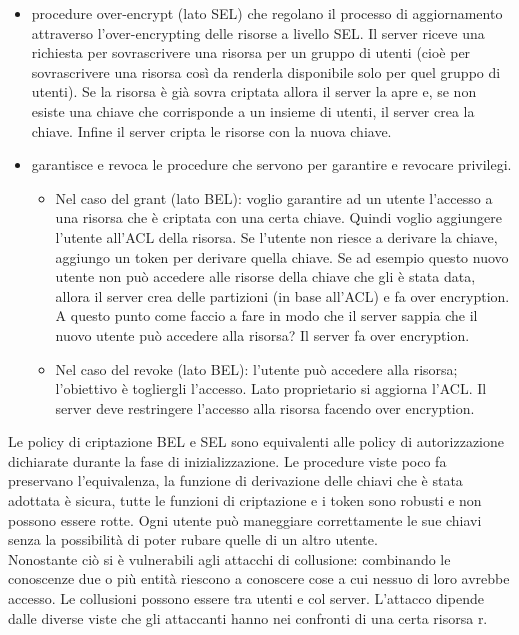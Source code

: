\begin{itemize}
    \item procedure over-encrypt (lato SEL) che regolano il processo di aggiornamento attraverso l'over-encrypting delle risorse a livello SEL. Il server riceve una richiesta per sovrascrivere una risorsa per un gruppo di utenti (cioè per sovrascrivere una risorsa così da renderla disponibile solo per quel gruppo di utenti). Se la risorsa è già sovra criptata allora il server la apre e, se non esiste una chiave che corrisponde a un insieme di utenti, il server crea la chiave. Infine il server cripta le risorse con la nuova chiave.
    \item garantisce e revoca le procedure che servono per garantire e revocare privilegi. 
    \begin{itemize}
        \item Nel caso del grant (lato BEL): voglio garantire ad un utente l’accesso a una risorsa che è criptata con una certa chiave. Quindi voglio aggiungere l’utente all’ACL della risorsa. Se l’utente non riesce a derivare la chiave, aggiungo un token per derivare quella chiave. Se ad esempio questo nuovo utente non può accedere alle risorse della chiave che gli è stata data, allora il server crea delle partizioni (in base all’ACL) e fa over encryption. A questo punto come faccio a fare in modo che il server sappia che il nuovo utente può accedere alla risorsa? Il server fa over encryption.
        \item Nel caso del revoke (lato BEL): l’utente può accedere alla risorsa; l’obiettivo è togliergli l’accesso. Lato proprietario si aggiorna l’ACL. Il server deve restringere l'accesso alla risorsa facendo over encryption.
    \end{itemize}
\end{itemize}
Le policy di criptazione BEL e SEL sono equivalenti alle policy di autorizzazione dichiarate durante la fase di inizializzazione. Le procedure viste poco fa preservano l'equivalenza, la funzione di derivazione delle chiavi che è stata adottata è sicura, tutte le funzioni di criptazione e i token sono robusti e non possono essere rotte. Ogni utente può maneggiare correttamente le sue chiavi senza la possibilità di poter rubare quelle di un altro utente.\\
Nonostante ciò si è vulnerabili agli attacchi di collusione: combinando le conoscenze due o più entità riescono a conoscere cose a cui nessuo di loro avrebbe accesso. Le collusioni possono essere tra utenti e col server. L'attacco dipende dalle diverse viste che gli attaccanti hanno nei confronti di una certa risorsa r. \\
